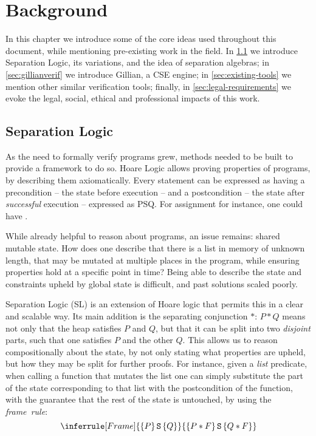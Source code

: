 \chapter{Background} \label{chap:background}

In this chapter we introduce some of the core ideas used throughout this document, while mentioning pre-existing work in the field. In \cref{sec:separationlogic} we introduce Separation Logic, its variations, and the idea of separation algebras; in \cref{sec:gillianverif} we introduce Gillian, a CSE engine; in \cref{sec:existing-tools} we mention other similar verification tools; finally, in \cref{sec:legal-requirements} we evoke the legal, social, ethical and professional impacts of this work.

\section{Separation Logic} \label{sec:separationlogic}

As the need to formally verify programs grew, methods needed to be built to provide a framework to do so. Hoare Logic \cite{hoarelogic} allows proving properties of programs, by describing them axiomatically. Every statement can be expressed as having a precondition -- the state before execution -- and a postcondition -- the state after \emph{successful} execution -- expressed as \SLtriple PSQ. For assignment for instance, one could have .

While already helpful to reason about programs, an issue remains: shared mutable state. How does one describe that there is a list in memory of unknown length, that may be mutated at multiple places in the program, while ensuring properties hold at a specific point in time? Being able to describe the state and constraints upheld by global state is difficult, and past solutions scaled poorly.

Separation Logic (SL) \cite{seplogic1, seplogic2} is an extension of Hoare logic that permits this in a clear and scalable way. Its main addition is the separating conjunction $*$: $P * Q$ means not only that the heap satisfies $P$ and $Q$, but that it can be split into two \emph{disjoint} parts, such that one satisfies $P$ and the other $Q$. This allows us to reason compositionally about the state, by not only stating what properties are upheld, but how they may be split for further proofs. For instance, given a \emph{list} predicate, when calling a function that mutates the list one can simply substitute the part of the state corresponding to that list with the postcondition of the function, with the guarantee that the rest of the state is untouched, by using the \emph{frame~rule}:
\[
\inferrule[Frame]
	{\SLtriple{P}{S}{Q}}
	{\SLtriple{P*F}{S}{Q*F}}
\]

